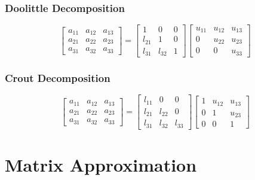 \subsubsection{Doolittle Decomposition}\label{LU: Doolittle Decomposition}

\[
    \displaystyle 
    \begin{bmatrix}
        a_{11} & a_{12} & a_{13} \\
        a_{21} & a_{22} & a_{23}\\
        a_{31} & a_{32} & a_{33}
    \end{bmatrix}
    =
    \begin{bmatrix}
        1 & 0 & 0\\
        l _{21} & 1 & 0\\
        l _{31} & l _{32} & 1
    \end{bmatrix}
    \begin{bmatrix}
        u_{11} & u_{12} & u_{13}\\
        0 & u_{22} & u_{23}\\
        0 & 0 & u_{33}
    \end{bmatrix}
\]

\subsubsection{Crout Decomposition}\label{LU: Crout Decomposition}

\[
    \displaystyle 
    \begin{bmatrix}
        a_{11} & a_{12} & a_{13} \\
        a_{21} & a_{22} & a_{23}\\
        a_{31} & a_{32} & a_{33}
    \end{bmatrix}
    =
    \begin{bmatrix}
        l _{11} & 0 & 0\\
        l _{21} & l _{22} & 0\\
        l _{31} & l _{32} & l _{33}
    \end{bmatrix}
    \begin{bmatrix}
        1 & u_{12} & u_{13}\\
        0 & 1 & u_{23}\\
        0 & 0 & 1
    \end{bmatrix}
\]



\section{Matrix Approximation \cite{mfml-1}}\label{Matrix Approximation}

